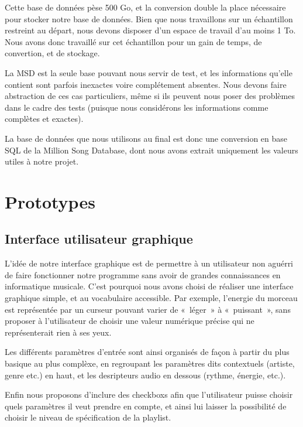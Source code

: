 Cette base de données pèse 500 Go, et la conversion double la place nécessaire 
pour stocker notre base de données. Bien que nous travaillons sur un 
échantillon restreint au départ, nous devons disposer d’un espace de travail 
d’au moins 1 To. Nous avons donc travaillé sur cet échantillon pour un gain de 
temps, de convertion, et de stockage.

La MSD est la seule base pouvant nous servir de test, et les informations 
qu'elle contient sont parfois inexactes voire complétement absentes. Nous 
devons faire abstraction de ces cas particuliers, même si ils peuvent nous 
poser des problèmes dans le cadre des tests (puisque nous considérons les 
informations comme complètes et exactes).

La base de données que nous utilisons au final est donc une conversion en base 
SQL de la Million Song Database, dont nous avons extrait uniquement les valeurs 
utiles à notre projet.

\section{Prototypes}
\label{besoins:proto}

\subsection{Interface utilisateur graphique}
\label{besoins:proto:gui}
    
L'idée de notre interface graphique est de permettre à un utilisateur non aguérri
de faire fonctionner notre programme sans avoir de grandes connaissances en
informatique musicale. C'est pourquoi nous avons choisi de réaliser une interface
graphique simple, et au vocabulaire accessible. Par exemple, l'energie du morceau
est représentée par un curseur pouvant varier de «~léger~» à «~puissant~», sans
proposer à l'utilisateur de choisir une valeur numérique précise qui ne
représenterait rien à ses yeux.
    
Les différents paramètres d'entrée sont ainsi organisés de façon à partir du plus
basique au plus complèxe, en regroupant les paramètres dits contextuels (artiste,
genre etc.) en haut, et les desripteurs audio en dessous (rythme, énergie, etc.).

Enfin nous proposons d'inclure des checkboxs afin que l'utilisateur puisse
choisir quels paramètres il veut prendre en compte, et ainsi lui laisser
la possibilité de choisir le niveau de spécification de la playlist.
    
